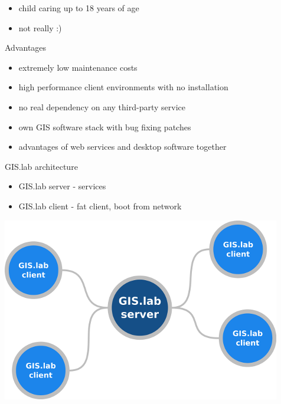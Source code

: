 \documentclass[12pt]{beamer}
\begin{document}
\begin{frame}
	\begin{itemize}[<+->]
		\item child caring up to 18 years of age
		\item not really :)
	\end{itemize}
\end{frame}


\begin{frame}{Advantages}
	\begin{itemize}[<+->]
		\item extremely low maintenance costs
		\item high performance client environments with no installation
		\item no real dependency on any third-party service
		\item own GIS software stack with bug fixing patches
		\item advantages of web services and desktop software together
	\end{itemize}
\end{frame}


\begin{frame}{GIS.lab architecture}
	\begin{itemize}
		\item GIS.lab server - services
		\item GIS.lab client - fat client, boot from network
	\end{itemize}
	\begin{center}
		\includegraphics[keepaspectratio=true,height=0.6\textheight]{images/gislab-architecture.png}
	\end{center}
\end{frame}
\end{document}
